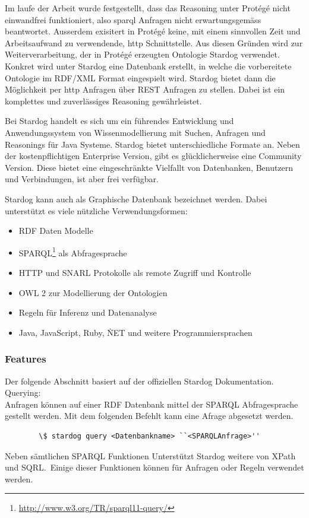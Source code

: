 Im laufe der Arbeit wurde festgestellt, dass das Reasoning unter Protégé nicht einwandfrei funktioniert, also sparql Anfragen nicht erwartungsgemäss beantwortet. Ausserdem exisitert in Protégé keine, mit einem sinnvollen Zeit und Arbeitsaufwand zu verwendende, http Schnittstelle. Aus diesen Gründen wird zur Weiterverarbeitung, der in Protégé erzeugten Ontologie Stardog verwendet.\\
Konkret wird unter Stardog eine Datenbank erstellt, in welche die vorbereitete Ontologie im RDF/XML Format eingespielt wird. Stardog bietet dann die Möglichkeit per http Anfragen über REST Anfragen zu stellen. Dabei ist ein komplettes und zuverlässiges Reasoning gewährleistet.

Bei Stardog handelt es sich um ein führendes Entwicklung und Anwendungssystem von Wissenmodellierung mit Suchen, Anfragen und Reasonings für Java Systeme. Stardog bietet unterschiedliche Formate an. Neben der kostenpflichtigen Enterprise Version, gibt es glücklicherweise eine Community Version. Diese bietet eine eingeschränkte Vielfallt von Datenbanken, Benutzern und Verbindungen, ist aber frei verfügbar.\cite{stardog}

Stardog kann auch als Graphische Datenbank bezeichnet werden. Dabei unterstützt es viele nützliche Verwendungsformen:
\begin{itemize}
	\item RDF Daten Modelle
	\item SPARQL\footnote{\url{http://www.w3.org/TR/sparql11-query/}} als Abfragesprache
	\item HTTP und SNARL Protokolle als remote Zugriff und Kontrolle
	\item OWL 2 zur Modellierung der Ontologien
	\item Regeln für Inferenz und Datenanalyse
	\item Java, JavaScript, Ruby, \.NET und weitere Programmiersprachen
\end{itemize}
\cite{stardogDocu}

\subsubsection{Features}
\label{ssubsec:features}
Der folgende Abschnitt basiert auf der offiziellen Stardog Dokumentation.\cite{stardogDocuUsing}\\

Querying:\\
Anfragen können auf einer RDF Datenbank mittel der SPARQL Abfragesprache gestellt werden. Mit dem folgenden Befehlt kann eine Afrage abgesetzt werden.\\
\begin{lstlisting}
		\$ stardog query <Datenbankname> ``<SPARQLAnfrage>''
\end{lstlisting}	
Neben sämtlichen SPARQL Funktionen Unterstützt Stardog weitere von XPath und SQRL.\ Einige dieser Funktionen können für Anfragen oder Regeln verwendet werden.

